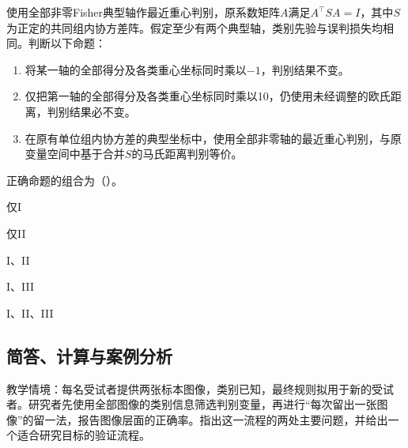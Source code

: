 \par\noindent\begin{minipage}{\linewidth}
使用全部非零Fisher典型轴作最近重心判别，原系数矩阵$A$满足$A^\top SA=I$，其中$S$为正定的共同组内协方差阵。假定至少有两个典型轴，类别先验与误判损失均相同。判断以下命题：
\begin{enumerate}[label=\Roman*.]
\item 将某一轴的全部得分及各类重心坐标同时乘以$-1$，判别结果不变。
\item 仅把第一轴的全部得分及各类重心坐标同时乘以10，仍使用未经调整的欧氏距离，判别结果必不变。
\item 在原有单位组内协方差的典型坐标中，使用全部非零轴的最近重心判别，与原变量空间中基于合并$S$的马氏距离判别等价。
\end{enumerate}
正确命题的组合为（\quad）。
\begin{choices}
\item 仅I
\item 仅II
\item I、II
\item I、III
\item I、II、III
\end{choices}
\end{minipage}\par\medskip

\subsection{简答、计算与案例分析}

教学情境：每名受试者提供两张标本图像，类别已知，最终规则拟用于新的受试者。研究者先使用全部图像的类别信息筛选判别变量，再进行“每次留出一张图像”的留一法，报告图像层面的正确率。指出这一流程的两处主要问题，并给出一个适合研究目标的验证流程。


